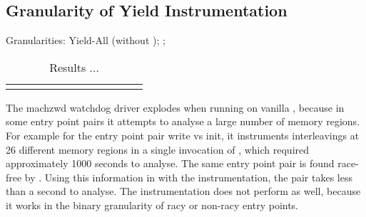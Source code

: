 \subsection{Granularity of Yield Instrumentation}
\label{eval:granularity}

Granularities: Yield-All (\corral without \whoop); \yieldcoarse; \yieldmr

\newcommand{\colspacing}{\hspace{1.8em}}
\begin{table*}[t]
\small
\centering
\begin{tabular}{l rrr rr rr rr rr}
\centering

\end{tabular}
\caption{Results ...}
\label{tab:granularity}
\end{table*}

The machzwd watchdog driver explodes when running on vanilla \corral, because in some entry point pairs it attempts to analyse a large number of memory regions. For example for the entry point pair write vs init, it instruments interleavings at 26 different memory regions in a single invocation of \corral, which required approximately 1000 seconds to analyse. The same entry point pair is found race-free by \whoop. Using this information in \corral with the \yieldmr instrumentation, the pair takes less than a second to analyse. The \yieldcoarse instrumentation does not perform as well, because it works in the binary granularity of racy or non-racy entry points.